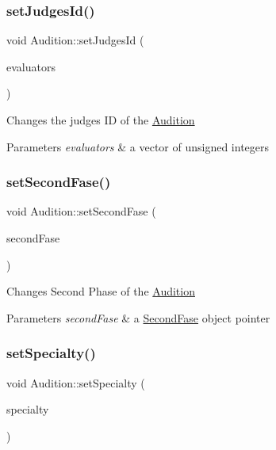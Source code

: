 \subsubsection{\texorpdfstring{set\+Judges\+Id()}{setJudgesId()}}
{\footnotesize\ttfamily void Audition\+::set\+Judges\+Id (\begin{DoxyParamCaption}\item[{std\+::vector$<$ unsigned int $>$}]{evaluators }\end{DoxyParamCaption})}

Changes the judge\textquotesingle{}s ID of the \hyperlink{class_audition}{Audition} 
\begin{DoxyParams}{Parameters}
{\em evaluators} & a vector of unsigned integers \\
\hline
\end{DoxyParams}
\mbox{\label{class_audition_ac24a4a35667f1826ecf5e2c330ca82a7}} 
\subsubsection{\texorpdfstring{set\+Second\+Fase()}{setSecondFase()}}
{\footnotesize\ttfamily void Audition\+::set\+Second\+Fase (\begin{DoxyParamCaption}\item[{\hyperlink{class_second_fase}{Second\+Fase} $\ast$}]{second\+Fase }\end{DoxyParamCaption})}

Changes Second Phase of the \hyperlink{class_audition}{Audition} 
\begin{DoxyParams}{Parameters}
{\em second\+Fase} & a \hyperlink{class_second_fase}{Second\+Fase} object pointer \\
\hline
\end{DoxyParams}
\mbox{\label{class_audition_a708f47023fbf0d1d740cda888583b2bd}} 
\subsubsection{\texorpdfstring{set\+Specialty()}{setSpecialty()}}
{\footnotesize\ttfamily void Audition\+::set\+Specialty (\begin{DoxyParamCaption}\item[{std\+::string}]{specialty }\end{DoxyParamCaption})}

